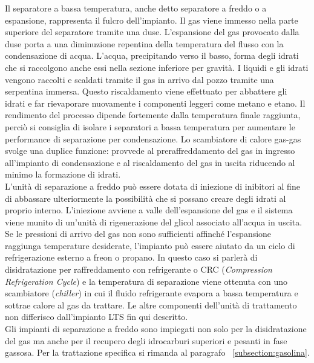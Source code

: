 Il separatore a bassa temperatura, anche detto separatore a freddo o a espansione, rappresenta il fulcro dell'impianto. Il gas viene immesso nella parte superiore del separatore tramite una duse. L'espansione del gas provocato dalla duse porta a una diminuzione repentina della temperatura del flusso con la condensazione di acqua. L'acqua, precipitando verso il basso, forma degli idrati che si raccolgono anche essi nella sezione inferiore per gravità. I liquidi e gli idrati vengono raccolti e scaldati tramite il gas in arrivo dal pozzo tramite una serpentina immersa. Questo riscaldamento viene effettuato per abbattere gli idrati e far rievaporare nuovamente i componenti leggeri come metano e etano. Il rendimento del processo dipende fortemente dalla temperatura finale raggiunta, perciò si consiglia di isolare i separatori a bassa temperatura per aumentare le performance di separazione per condensazione.
Lo scambiatore di calore gas-gas svolge una duplice funzione: provvede al preraffreddamento del gas in ingresso all'impianto di condensazione e al riscaldamento del gas in uscita riducendo al minimo la formazione di idrati. \\
L'unità di separazione a freddo può essere dotata di iniezione di inibitori al fine di abbassare ulteriormente la possibilità che si possano creare degli idrati al proprio interno. L'iniezione avviene a valle dell'espansione del gas e il sistema viene munito di un'unità di rigenerazione del glicol associato all'acqua in uscita.\\
Se le pressioni di arrivo del gas non sono sufficienti affinché l'espansione raggiunga temperature desiderate, l'impianto può essere aiutato da un ciclo di refrigerazione esterno a freon o propano. In questo caso si parlerà di disidratazione per raffreddamento con refrigerante o CRC (\textit{Compression Refrigeration Cycle}) e la temperatura di separazione viene ottenuta con uno scambiatore (\textit{chiller}) in cui il fluido refrigerante evapora a bassa temperatura e sottrae calore al gas da trattare. Le altre componenti dell'unità di trattamento non differisco dall'impianto LTS fin qui descritto.\\
Gli impianti di separazione a freddo sono impiegati non solo per la disidratazione del gas ma anche per il recupero degli idrocarburi superiori e pesanti in fase gassosa. Per la trattazione specifica si rimanda al paragrafo ~\ref{subsection:gasolina}.


